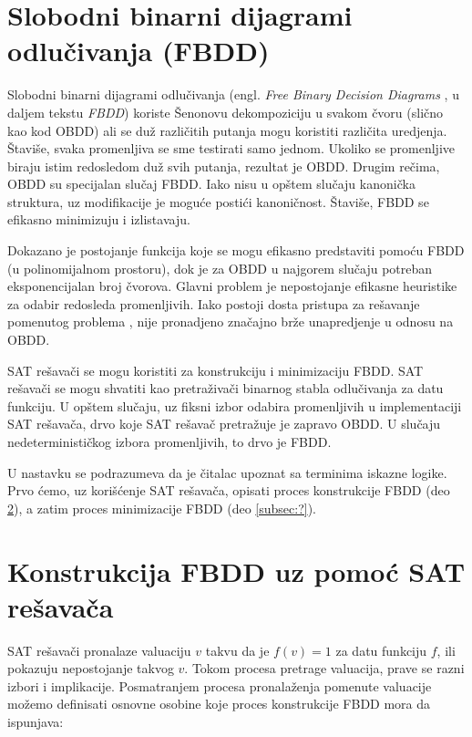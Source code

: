 \section{Slobodni binarni dijagrami odlu\v{c}ivanja (FBDD)}
\label{sec:FBDD}

Slobodni binarni dijagrami odlu\v{c}ivanja (engl. \emph{Free Binary Decision Diagrams} \cite{FBDD}, u daljem tekstu \emph{FBDD}) koriste \v{S}enonovu dekompoziciju u svakom \v{c}voru (sli\v{c}no kao kod OBDD) ali se du\v{z} razli\v{c}itih putanja mogu koristiti razli\v{c}ita uredjenja. \v{S}tavi\v{s}e, svaka promenljiva se sme testirati samo jednom. Ukoliko se promenljive biraju istim redosledom du\v{z} svih putanja, rezultat je OBDD. Drugim re\v{c}ima, OBDD su specijalan slu\v{c}aj FBDD. Iako nisu u op\v{s}tem slu\v{c}aju kanoni\v{c}ka struktura, uz modifikacije je mogu\'c{}e posti\'c{}i kanoni\v{c}nost. \v{S}tavi\v{s}e, FBDD se efikasno minimizuju i izlistavaju.

Dokazano je  postojanje funkcija koje se mogu efikasno predstaviti pomo\'c{}u FBDD (u polinomijalnom prostoru), dok je za OBDD u najgorem slu\v{c}aju potreban eksponencijalan broj \v{c}vorova. Glavni problem je nepostojanje efikasne heuristike za odabir redosleda promenljivih. Iako postoji dosta pristupa za re\v{s}avanje pomenutog problema \cite{FBDD}, nije pronadjeno zna\v{c}ajno br\v{z}e unapredjenje u odnosu na OBDD.

SAT re\v{s}ava\v{c}i se mogu koristiti za konstrukciju i minimizaciju FBDD. SAT re\v{s}ava\v{c}i se mogu shvatiti kao pretra\v{z}iva\v{c}i binarnog stabla odlu\v{c}ivanja za datu funkciju. U op\v{s}tem slu\v{c}aju, uz fiksni izbor odabira promenljivih u implementaciji SAT re\v{s}ava\v{c}a, drvo koje SAT re\v{s}ava\v{c} pretra\v{z}uje je zapravo OBDD. U slu\v{c}aju nedeterministi\v{c}kog izbora promenljivih, to drvo je FBDD.

U nastavku se podrazumeva da je \v{c}italac upoznat sa terminima iskazne logike. Prvo \'c{}emo, uz kori\v{s}\'c{}enje SAT re\v{s}ava\v{c}a, opisati proces konstrukcije FBDD (deo \ref{subsec:FBDDConstructionViaSAT}), a zatim proces minimizacije FBDD (deo \ref{subsec:?}).


\section{Konstrukcija FBDD uz pomo\'c{} SAT re\v{s}ava\v{c}a}
\label{subsec:FBDDConstructionViaSAT}

SAT re\v{s}ava\v{c}i pronalaze valuaciju $v$ takvu da je $f(v) = 1$ za datu funkciju $f$, ili pokazuju nepostojanje takvog $v$. Tokom procesa pretrage valuacija, prave se razni izbori i implikacije. Posmatranjem procesa pronala\v{z}enja pomenute valuacije mo\v{z}emo definisati osnovne osobine koje proces konstrukcije FBDD mora da ispunjava:

